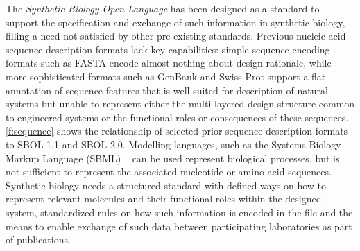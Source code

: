 The \emph{Synthetic Biology Open Language} has been designed as a standard to support the specification and exchange of such information in synthetic biology, filling a need not satisfied by other pre-existing standards.
Previous nucleic acid sequence description formats lack key capabilities: simple sequence encoding formats such as FASTA encode almost nothing about design rationale, while more sophisticated formats such as GenBank and Swiss-Prot support a flat annotation of sequence features that is well suited for description of natural systems but unable to represent either the multi-layered design structure common to engineered systems or the functional roles or consequences of these sequences.
\ref{f:sequence} shows the relationship of selected prior sequence description formats to SBOL 1.1 and SBOL 2.0.
Modelling languages, such as the Systems Biology Markup Language (SBML) ~\cite{SBML} can be used represent biological processes, but is not sufficient to represent the associated nucleotide or amino acid sequences.  %
Synthetic biology needs a structured standard with defined ways on how to represent relevant molecules and their functional roles within the designed system, standardized rules on how such information is encoded in the file and the means to enable exchange of such data between participating laboratories as part of publications. 

